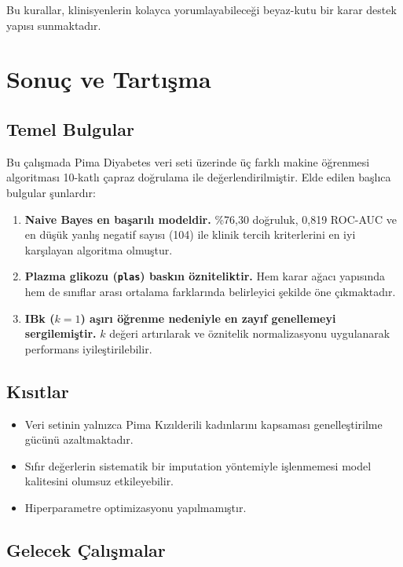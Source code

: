 \documentclass[12pt,a4paper]{article}
\begin{document}
Bu kurallar, klinisyenlerin kolayca yorumlayabileceği beyaz-kutu bir karar
destek yapısı sunmaktadır.

\section{Sonuç ve Tartışma}

\subsection{Temel Bulgular}

Bu çalışmada Pima Diyabetes veri seti üzerinde üç farklı makine öğrenmesi
algoritması 10-katlı çapraz doğrulama ile değerlendirilmiştir.
Elde edilen başlıca bulgular şunlardır:

\begin{enumerate}
  \item \textbf{Naive Bayes en başarılı modeldir.} \%76{,}30 doğruluk,
        0{,}819 ROC-AUC ve en düşük yanlış negatif sayısı (104) ile klinik
        tercih kriterlerini en iyi karşılayan algoritma olmuştur.
  \item \textbf{Plazma glikozu (\texttt{plas}) baskın özniteliktir.}
        Hem karar ağacı yapısında hem de sınıflar arası ortalama farklarında
        belirleyici şekilde öne çıkmaktadır.
  \item \textbf{IBk ($k{=}1$) aşırı öğrenme nedeniyle en zayıf genellemeyi
        sergilemiştir.} $k$ değeri artırılarak ve öznitelik normalizasyonu
        uygulanarak performans iyileştirilebilir.
\end{enumerate}

\subsection{Kısıtlar}

\begin{itemize}
  \item Veri setinin yalnızca Pima Kızılderili kadınlarını kapsaması
        genelleştirilme gücünü azaltmaktadır.
  \item Sıfır değerlerin sistematik bir imputation yöntemiyle işlenmemesi
        model kalitesini olumsuz etkileyebilir.
  \item Hiperparametre optimizasyonu yapılmamıştır.
\end{itemize}

\subsection{Gelecek Çalışmalar}
\end{document}
